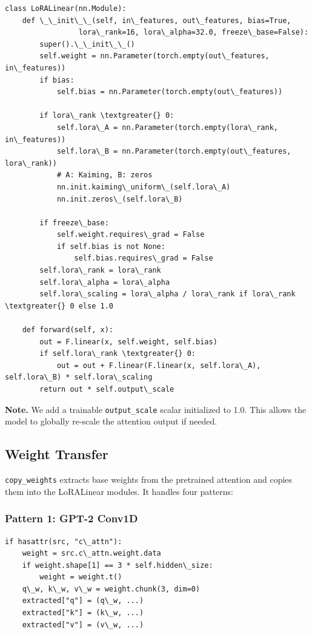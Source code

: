 \begin{lstlisting}
class LoRALinear(nn.Module):
    def \_\_init\_\_(self, in\_features, out\_features, bias=True, 
                 lora\_rank=16, lora\_alpha=32.0, freeze\_base=False):
        super().\_\_init\_\_()
        self.weight = nn.Parameter(torch.empty(out\_features, in\_features))
        if bias:
            self.bias = nn.Parameter(torch.empty(out\_features))
        
        if lora\_rank \textgreater{} 0:
            self.lora\_A = nn.Parameter(torch.empty(lora\_rank, in\_features))
            self.lora\_B = nn.Parameter(torch.empty(out\_features, lora\_rank))
            # A: Kaiming, B: zeros
            nn.init.kaiming\_uniform\_(self.lora\_A)
            nn.init.zeros\_(self.lora\_B)
        
        if freeze\_base:
            self.weight.requires\_grad = False
            if self.bias is not None:
                self.bias.requires\_grad = False
        self.lora\_rank = lora\_rank
        self.lora\_alpha = lora\_alpha
        self.lora\_scaling = lora\_alpha / lora\_rank if lora\_rank \textgreater{} 0 else 1.0
    
    def forward(self, x):
        out = F.linear(x, self.weight, self.bias)
        if self.lora\_rank \textgreater{} 0:
            out = out + F.linear(F.linear(x, self.lora\_A), self.lora\_B) * self.lora\_scaling
        return out * self.output\_scale
\end{lstlisting}

\textbf{Note.} We add a trainable \texttt{output\_scale} scalar initialized to 1.0. This 
allows the model to globally re-scale the attention output if needed.

\subsection{Weight Transfer}

\texttt{copy\_weights} extracts base weights from the pretrained attention and 
copies them into the LoRALinear modules. It handles four patterns:

\subsubsection{Pattern 1: GPT-2 Conv1D}

\begin{lstlisting}
if hasattr(src, "c\_attn"):
    weight = src.c\_attn.weight.data
    if weight.shape[1] == 3 * self.hidden\_size:
        weight = weight.t()
    q\_w, k\_w, v\_w = weight.chunk(3, dim=0)
    extracted["q"] = (q\_w, ...)
    extracted["k"] = (k\_w, ...)
    extracted["v"] = (v\_w, ...)
\end{lstlisting}

